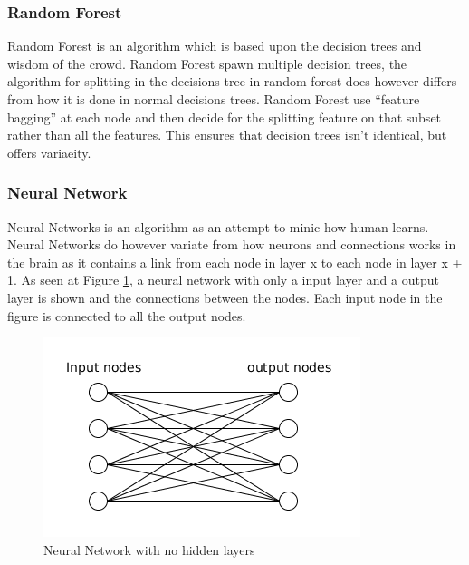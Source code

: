 \subsubsection{Random Forest}
Random Forest is an algorithm which is based upon the decision trees and wisdom of the crowd.
Random Forest spawn multiple decision trees, the algorithm for splitting in the decisions tree in random forest does however differs from how it is done in normal decisions trees.
Random Forest use ``feature bagging'' at each node and then decide for the splitting feature on that subset rather than all the features. This ensures that decision trees isn't identical, but offers variaeity.

\subsubsection{Neural Network}
Neural Networks is an algorithm as an attempt to minic how human learns.
Neural Networks do however variate from how neurons and connections works in the brain as it contains a link from each node in layer x to each node in layer x + 1. As seen at Figure \ref{fig:neuralnetwork}, a neural network with only a input layer and a output layer is shown and the connections between the nodes. Each input node in the figure is connected to all the output nodes.

\begin{figure}
  \centering
  \includegraphics[width=0.7\linewidth]{Images/neuralnetwork}
  \caption{Neural Network with no hidden layers}
  \label{fig:neuralnetwork}
\end{figure}

